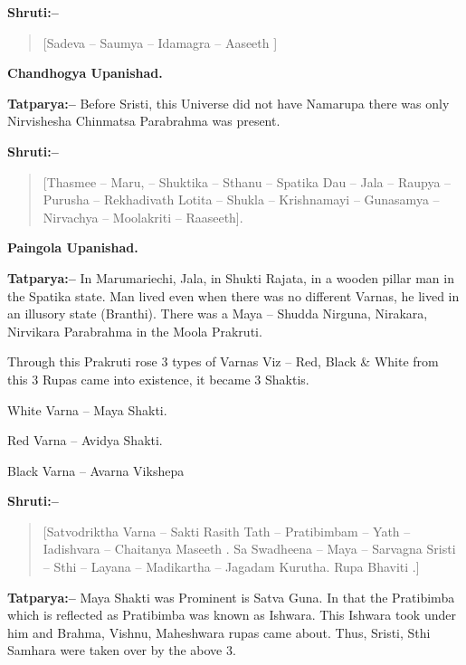 \textbf{Shruti:–}

\begin{verse}
[Sadeva – Saumya – Idamagra – Aaseeth ]
\end{verse}

\begin{flushright}
\textbf{Chandhogya Upanishad.}
\end{flushright}

\textbf{Tatparya:–} Before Sristi, this Universe did not have Namarupa there was only Nirvishesha Chinmatsa Parabrahma was present.

\textbf{Shruti:–}

\begin{verse}
[Thasmee – Maru, – Shuktika – Sthanu – Spatika Dau – Jala – Raupya – Purusha – Rekhadivath  Lotita – Shukla – Krishnamayi – Gunasamya – Nirvachya – Moolakriti – Raaseeth].
\end{verse}

\begin{flushright}
\textbf{Paingola Upanishad.}
\end{flushright}

\textbf{Tatparya:–} In Marumariechi, Jala, in Shukti Rajata, in a wooden pillar man in the Spatika state. Man lived even when there was no different Varnas, he lived in an illusory state (Branthi). There was a Maya – Shudda Nirguna, Nirakara, Nirvikara Parabrahma in the Moola Prakruti.

Through this Prakruti rose 3 types of Varnas Viz – Red, Black \& White from this 3 Rupas came into existence, it became 3 Shaktis.

White Varna – Maya Shakti.

Red Varna – Avidya Shakti.

Black Varna – Avarna Vikshepa

\textbf{Shruti:–}

\begin{verse}
[Satvodriktha Varna – Sakti Rasith  Tath – Pratibimbam – Yath – Iadishvara – Chaitanya Maseeth . Sa Swadheena – Maya – Sarvagna  Sristi – Sthi – Layana – Madikartha – Jagadam Kurutha. Rupa Bhaviti .]
\end{verse}

\textbf{Tatparya:–} Maya Shakti was Prominent is Satva Guna. In that the Pratibimba which is reflected as Pratibimba was known as Ishwara. This Ishwara took under him and Brahma, Vishnu, Maheshwara rupas came about. Thus, Sristi, Sthi Samhara were taken over by the above 3.

